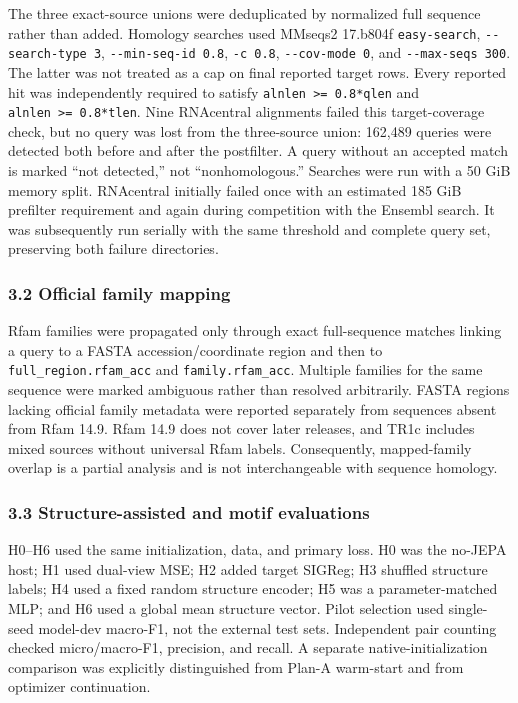 \documentclass[
  11pt]{article}
\begin{document}
The three exact-source unions were deduplicated by normalized full
sequence rather than added. Homology searches used MMseqs2 17.b804f
\texttt{easy-search}, \texttt{-\/-search-type\ 3},
\texttt{-\/-min-seq-id\ 0.8}, \texttt{-c\ 0.8},
\texttt{-\/-cov-mode\ 0}, and \texttt{-\/-max-seqs\ 300}. The latter was
not treated as a cap on final reported target rows. Every reported hit
was independently required to satisfy
\texttt{alnlen\ \textgreater{}=\ 0.8*qlen} and
\texttt{alnlen\ \textgreater{}=\ 0.8*tlen}. Nine RNAcentral alignments
failed this target-coverage check, but no query was lost from the
three-source union: 162,489 queries were detected both before and after
the postfilter. A query without an accepted match is marked ``not
detected,'' not ``nonhomologous.'' Searches were run with a 50 GiB
memory split. RNAcentral initially failed once with an estimated 185 GiB
prefilter requirement and again during competition with the Ensembl
search. It was subsequently run serially with the same threshold and
complete query set, preserving both failure directories.

\hypertarget{32-official-family-mapping}{%
\subsubsection{3.2 Official family
mapping}\label{32-official-family-mapping}}

Rfam families were propagated only through exact full-sequence matches
linking a query to a FASTA accession/coordinate region and then to
\texttt{full\_region.rfam\_acc} and \texttt{family.rfam\_acc}. Multiple
families for the same sequence were marked ambiguous rather than
resolved arbitrarily. FASTA regions lacking official family metadata
were reported separately from sequences absent from Rfam 14.9. Rfam 14.9
does not cover later releases, and TR1c includes mixed sources without
universal Rfam labels. Consequently, mapped-family overlap is a partial
analysis and is not interchangeable with sequence homology.

\hypertarget{33-structure-assisted-and-motif-evaluations}{%
\subsubsection{3.3 Structure-assisted and motif
evaluations}\label{33-structure-assisted-and-motif-evaluations}}

H0--H6 used the same initialization, data, and primary loss. H0 was the
no-JEPA host; H1 used dual-view MSE; H2 added target SIGReg; H3 shuffled
structure labels; H4 used a fixed random structure encoder; H5 was a
parameter-matched MLP; and H6 used a global mean structure vector. Pilot
selection used single-seed model-dev macro-F1, not the external test
sets. Independent pair counting checked micro/macro-F1, precision, and
recall. A separate native-initialization comparison was explicitly
distinguished from Plan-A warm-start and from optimizer continuation.
\end{document}
